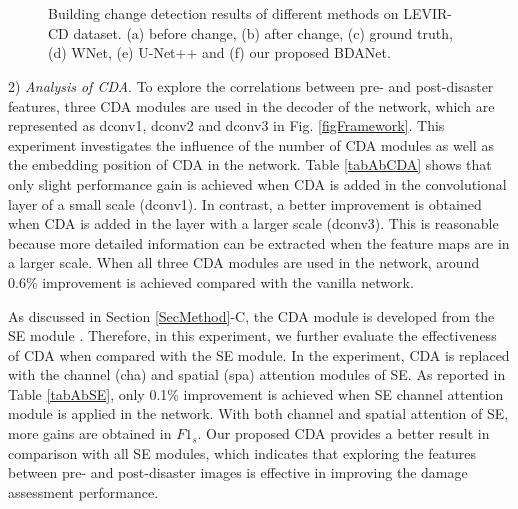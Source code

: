 \documentclass[journal]{IEEEtran}
\begin{document}
\begin{figure*}[t]
	     \hspace{-2.5mm}  
	    \hspace{-2.5mm}   \\
	    	   \hspace{-2.5mm}  
	    \hspace{-2.5mm}  
	 \hspace{-2.5mm}  
	  \hspace{-2.5mm}       
	     \hspace{-2.5mm}  
	    \hspace{-2.5mm}   \\
	\caption{Building change detection results of different methods on LEVIR-CD dataset. (a) before change, (b) after change, (c) ground truth, (d) WNet, (e) U-Net++  and (f) our proposed BDANet. }
	\label{figImgCD}
\end{figure*}

2) \textit{Analysis of CDA}. To explore the correlations between pre- and post-disaster features, three CDA modules are used in the decoder of the network, which are represented as dconv1, dconv2 and dconv3 in Fig. \ref{figFramework}. This experiment investigates the influence of the number of CDA modules as well as the embedding position of CDA in the network.  Table \ref{tabAbCDA} shows that only slight performance gain is achieved when CDA is added in the convolutional layer of a small scale (dconv1). In contrast, a better improvement is obtained when CDA is added in the layer with a larger scale (dconv3). This is reasonable because more detailed information can be extracted when the feature maps are in a larger scale. When all three CDA modules are used in the network, around 0.6\% improvement is achieved compared with the vanilla network.

As discussed in Section \ref{SecMethod}-C, the CDA module is developed from the SE module \cite{royRecalibratingFullyConvolutional2019}. Therefore, in this experiment, we further evaluate the effectiveness of CDA when compared with the SE module. In the experiment, CDA is replaced with the channel (cha) and spatial (spa) attention modules of SE. As reported in Table \ref{tabAbSE}, only 0.1\% improvement is achieved when SE channel attention module is applied in the network. With both channel and spatial attention of SE, more gains are obtained in $F1_s$. Our proposed CDA provides a better result in comparison with all SE modules, which indicates that exploring the features between pre- and post-disaster images is effective in improving the damage assessment performance.
\end{document}
